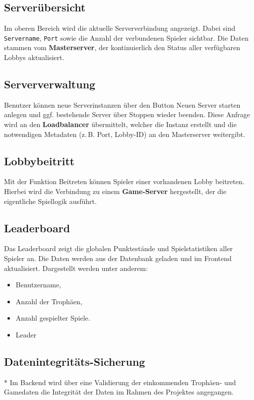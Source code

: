 \subsection{Serverübersicht}
Im oberen Bereich wird die aktuelle Serververbindung angezeigt. 
Dabei sind \texttt{Servername}, \texttt{Port} sowie die Anzahl der verbundenen Spieler sichtbar.  
Die Daten stammen vom \textbf{Masterserver}, der kontinuierlich den Status aller verfügbaren Lobbys aktualisiert.

\subsection{Serververwaltung}
Benutzer können neue Serverinstanzen über den Button \glqq Neuen Server starten\grqq{} anlegen und ggf. bestehende Server über \glqq Stoppen\grqq{} wieder beenden.
Diese Anfrage wird an den \textbf{Loadbalancer} übermittelt, welcher die Instanz erstellt und die notwendigen Metadaten (z.\,B. Port, Lobby-ID) an den Masterserver weitergibt.

\subsection{Lobbybeitritt}
Mit der Funktion \glqq Beitreten\grqq{} können Spieler einer vorhandenen Lobby beitreten.  
Hierbei wird die Verbindung zu einem \textbf{Game-Server} hergestellt, der die eigentliche Spiellogik ausführt.  

\subsection{Leaderboard}
Das Leaderboard zeigt die globalen Punktestände und Spielstatistiken aller Spieler an.  
Die Daten werden aus der Datenbank geladen und im Frontend aktualisiert.  
Dargestellt werden unter anderem:
\begin{itemize}
  \item Benutzername,
  \item Anzahl der Trophäen,
  \item Anzahl gespielter Spiele.
  \item Leader
\end{itemize}
\subsection{Datenintegritäts-Sicherung}*
Im Backend wird über eine Validierung der einkommenden Trophäen- und Gamedaten die Integrität der Daten im Rahmen des Projektes angegangen.




